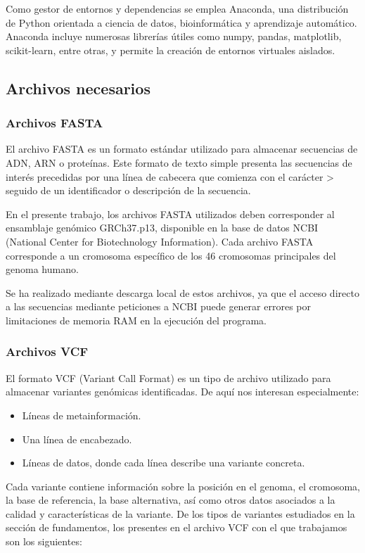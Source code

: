\documentclass[11pt,spanish,listoffigures,listoftables]{tfgetsinf}
\begin{document}
Como gestor de entornos y dependencias se emplea Anaconda, una distribución de Python orientada a ciencia de datos, bioinformática y aprendizaje automático. Anaconda incluye numerosas librerías útiles como numpy, pandas, matplotlib, scikit-learn, entre otras, y permite la creación de entornos virtuales aislados.

\subsection{Archivos necesarios}

\subsubsection{Archivos FASTA}

El archivo FASTA es un formato estándar utilizado para almacenar secuencias de ADN, ARN o proteínas. Este formato de texto simple presenta las secuencias de interés precedidas por una línea de cabecera que comienza con el carácter > seguido de un identificador o descripción de la secuencia. 

En el presente trabajo, los archivos FASTA utilizados deben corresponder al ensamblaje genómico GRCh37.p13, disponible en la base de datos NCBI (National Center for Biotechnology Information). Cada archivo FASTA corresponde a un cromosoma específico de los 46 cromosomas principales del genoma humano. 

Se ha realizado mediante descarga local de estos archivos, ya que el acceso directo a las secuencias mediante peticiones a NCBI puede generar errores por limitaciones de memoria RAM en la ejecución del programa. 

\subsubsection{Archivos VCF}

El formato VCF (Variant Call Format) es un tipo de archivo utilizado para almacenar variantes genómicas identificadas. De aquí nos interesan especialmente: 

\begin{itemize}
   \item Líneas de metainformación. 
   \item Una línea de encabezado.
   \item Líneas de datos, donde cada línea describe una variante concreta. 
\end{itemize}

Cada variante contiene información sobre la posición en el genoma, el cromosoma, la base de referencia, la base alternativa, así como otros datos asociados a la calidad y características de la variante. De los tipos de variantes estudiados en la sección de fundamentos, los presentes en el archivo VCF con el que trabajamos son los siguientes: 
\end{document}
